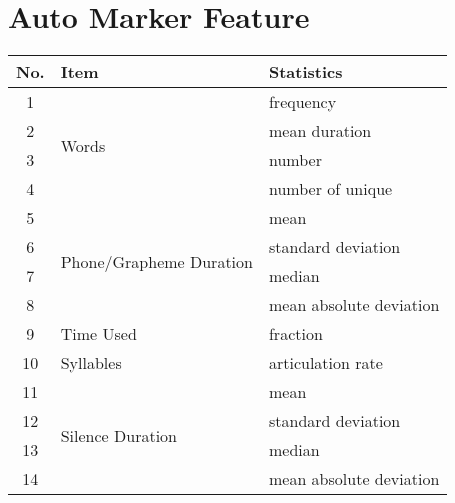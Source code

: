 \chapter{Auto Marker Feature}

\begin{table}[H]
    \centering
    \begin{tabular}{|c|l|l|}
        \hline
        \textbf{No.} & \textbf{Item}                            & \textbf{Statistics}                    \\
        \hline
        1            & \multirow{4}{*}{Words}                   & frequency                              \\
        2            &                                          & mean duration                          \\
        3            &                                          & number                                 \\
        4            &                                          & number of unique                       \\
        \hline
        5            & \multirow{4}{*}{Phone/Grapheme Duration} & mean                                   \\
        6            &                                          & standard deviation                     \\
        7            &                                          & median                                 \\
        8            &                                          & mean absolute deviation                \\
        \hline
        9            & Time Used                                & fraction                               \\
        \hline
        10           & Syllables                                & articulation rate                      \\
        \hline
        11           & \multirow{4}{*}{Silence Duration}        & mean                                   \\
        12           &                                          & standard deviation                     \\
        13           &                                          & median                                 \\
        14           &                                          & mean absolute deviation                \\

\end{tabular}
\end{table}
